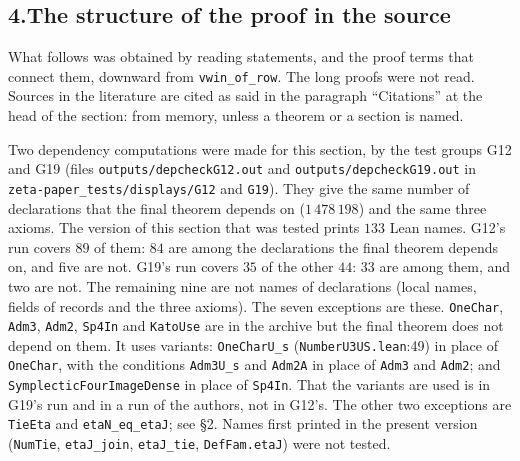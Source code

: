 \documentclass[11pt,letterpaper]{article}
\begin{document}
\subsection*{4.\quad The structure of the proof in the source}

What follows was obtained by reading statements, and the proof terms that connect them, downward from
\texttt{vwin\_of\_row}. The long proofs were not read. Sources in the literature are cited as said in the
paragraph ``Citations'' at the head of the section: from memory, unless a theorem or a section is named.

Two dependency computations were made for this section, by the test groups G12 and G19 (files
\texttt{outputs/depcheckG12.out} and \texttt{outputs/depcheckG19.out} in
\texttt{zeta-paper\_tests/displays/G12} and \texttt{G19}). They give the same number of declarations that
the final theorem depends on ($1\,478\,198$) and the same three axioms. The version of this section that
was tested prints $133$ Lean names. G12's run covers $89$ of them: $84$ are among the declarations the final
theorem depends on, and five are not. G19's run covers $35$ of the other $44$: $33$ are among them, and two
are not. The remaining nine are not names of declarations (local names, fields of records and the three
axioms). The seven exceptions are these. \texttt{OneChar},
\texttt{Adm3}, \texttt{Adm2}, \texttt{Sp4In} and \texttt{KatoUse} are in the archive but the final theorem
does not depend on them. It uses variants: \texttt{OneCharU\_s} (\texttt{NumberU3US.lean}:49) in place of
\texttt{OneChar}, with the conditions \texttt{Adm3U\_s} and \texttt{Adm2A} in place of \texttt{Adm3} and
\texttt{Adm2}; and \texttt{SymplecticFourImageDense} in place of \texttt{Sp4In}. That the variants are
used is in G19's run and in a run of the authors, not in G12's. The other two exceptions are \texttt{TieEta}
and \texttt{etaN\_eq\_etaJ}; see \S2. Names first printed in the present version (\texttt{NumTie},
\texttt{etaJ\_join}, \texttt{etaJ\_tie}, \texttt{DefFam.etaJ}) were not tested.
\end{document}

